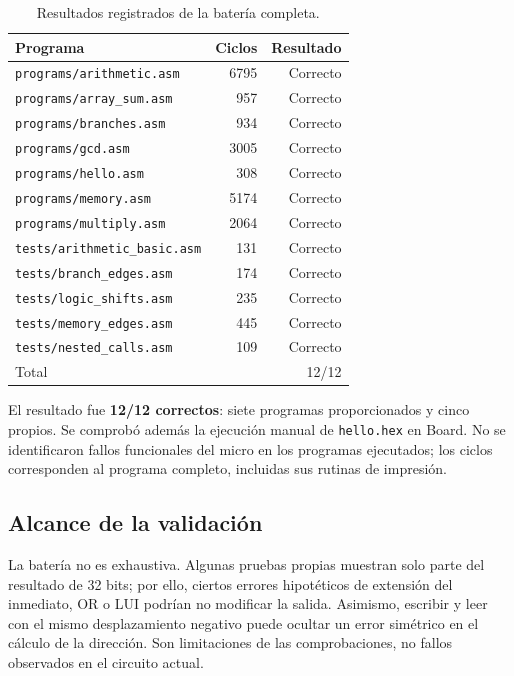 \documentclass[11pt,a4paper]{article}
\newcommand{\sig}[1]{\texttt{#1}}
\begin{document}
\begin{table}[htbp]
\centering
\small
\caption{Resultados registrados de la batería completa.}
\label{tab:resultados}
\begin{tabular}{@{}lrr@{}}
\toprule
Programa & Ciclos & Resultado \\
\midrule
\texttt{programs/arithmetic.asm} & 6795 & Correcto \\
\texttt{programs/array\_sum.asm} & 957 & Correcto \\
\texttt{programs/branches.asm} & 934 & Correcto \\
\texttt{programs/gcd.asm} & 3005 & Correcto \\
\texttt{programs/hello.asm} & 308 & Correcto \\
\texttt{programs/memory.asm} & 5174 & Correcto \\
\texttt{programs/multiply.asm} & 2064 & Correcto \\
\midrule
\texttt{tests/arithmetic\_basic.asm} & 131 & Correcto \\
\texttt{tests/branch\_edges.asm} & 174 & Correcto \\
\texttt{tests/logic\_shifts.asm} & 235 & Correcto \\
\texttt{tests/memory\_edges.asm} & 445 & Correcto \\
\texttt{tests/nested\_calls.asm} & 109 & Correcto \\
\midrule
Total & & 12/12 \\
\bottomrule
\end{tabular}
\end{table}


El resultado fue \textbf{12/12 correctos}: siete programas proporcionados
y cinco propios. Se comprobó además la ejecución manual de \sig{hello.hex}
en Board. No se identificaron fallos funcionales del micro en los programas
ejecutados; los ciclos corresponden al programa completo, incluidas sus
rutinas de impresión.

\subsection{Alcance de la validación}

La batería no es exhaustiva. Algunas pruebas propias muestran solo parte
del resultado de 32 bits; por ello, ciertos errores hipotéticos de extensión
del inmediato, OR o LUI podrían no modificar la salida. Asimismo, escribir
y leer con el mismo desplazamiento negativo puede ocultar un error
simétrico en el cálculo de la dirección. Son limitaciones de las
comprobaciones, no fallos observados en el circuito actual.
\end{document}
